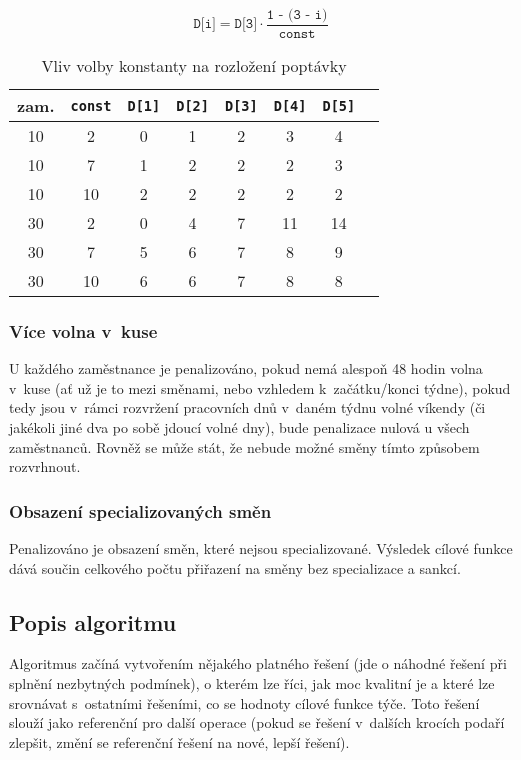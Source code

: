 \documentclass[twoside]{ctuthesis}
\begin{document}
\begin{equation}
	\label{eq:di}
	\texttt{D[i]} = \texttt{D[3]} \cdot \frac{\texttt{1 - (3 - i})}{\texttt{const}}
\end{equation}

\begin{table}[h]
	\caption{Vliv volby konstanty na rozložení poptávky}
	\label{tab:demandfactor}
	\begin{tabular}{|c|c|c|c|c|c|c|c|}
		\hline
		zam. & \texttt{const} & \texttt{D[1]} & \texttt{D[2]} & \texttt{D[3]} & \texttt{D[4]} & \texttt{D[5]} \\
		\hline
		10 & 2 & 0 & 1 & 2 & 3 & 4 \\
		10 & 7 & 1 & 2 & 2 & 2 & 3 \\
		10 & 10 & 2 & 2 & 2 & 2 & 2 \\
		30 & 2 & 0 & 4 & 7 & 11 & 14 \\
		30 & 7 & 5 & 6 & 7 & 8 & 9 \\
		30 & 10 & 6 & 6 & 7 & 8 & 8 \\
		\hline
	\end{tabular}
\end{table}

\subsubsection{Více volna v~kuse}
U každého zaměstnance je penalizováno, pokud nemá alespoň 48 hodin volna v~kuse (ať už je to mezi směnami, nebo vzhledem k~začátku/konci týdne), pokud tedy jsou v~rámci rozvržení pracovních dnů v~daném týdnu volné víkendy (či jakékoli jiné dva po sobě jdoucí volné dny), bude penalizace nulová u všech zaměstnanců. Rovněž se může stát, že nebude možné směny tímto způsobem rozvrhnout.

\subsubsection{Obsazení specializovaných směn}
Penalizováno je obsazení směn, které nejsou specializované. Výsledek cílové funkce dává součin celkového počtu přiřazení na směny bez specializace a sankcí.

\subsection{Popis algoritmu}
Algoritmus začíná vytvořením nějakého platného řešení (jde o náhodné řešení při splnění nezbytných podmínek), o kterém lze říci, jak moc kvalitní je a které lze srovnávat s~ostatními řešeními, co se hodnoty cílové funkce týče. Toto řešení slouží jako referenční pro další operace (pokud se řešení v~dalších krocích podaří zlepšit, změní se referenční řešení na nové, lepší řešení).
\end{document}
